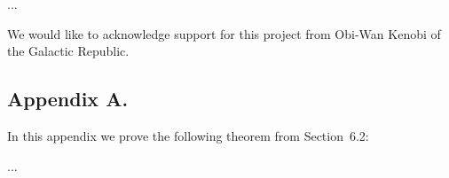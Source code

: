 \documentclass{obs}
\begin{document}
...

\begin{acks}
We would like to acknowledge support for this project from Obi-Wan Kenobi of the Galactic Republic.
\end{acks}

\begin{appendix}
\section*{Appendix A.}
\label{app:theorem}



In this appendix we prove the following theorem from
Section~6.2:

...
\end{appendix}



\end{document}
